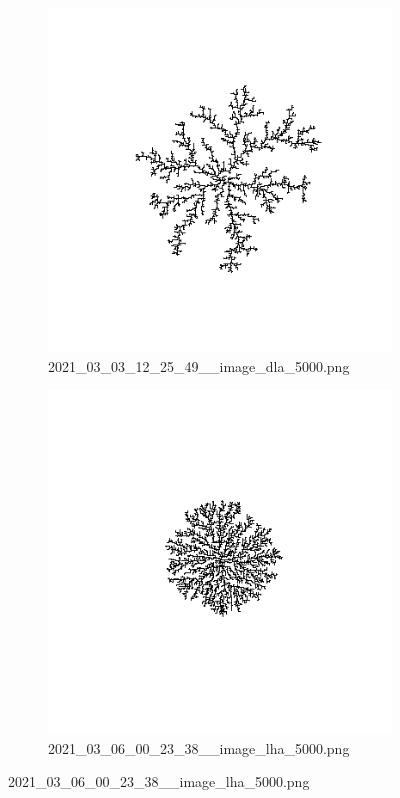 \documentclass[12pt,a4paper]{scrartcl}
\numberwithin{equation}{subsection}
\newcommand{\1}{\mathbbm{1}}
\numberwithin{equation}{section}
\theoremstyle{definition}
\begin{document}
\begin{figure}[h!]
	\centering
	\begin{subfigure}[b]{.49\textwidth}
		\includegraphics[width=1\linewidth]{images/ia/2021_03_03_12_25_49__image_dla_5000.png}
		\caption{2021\_03\_03\_12\_25\_49\_\_image\_dla\_5000.png}
	\end{subfigure}
	\begin{subfigure}[b]{.49\textwidth}
		\includegraphics[width=1\linewidth]{images/ia/2021_03_06_00_23_38__image_lha_5000.png}
		\caption{2021\_03\_06\_00\_23\_38\_\_image\_lha\_5000.png}
	\end{subfigure}
\end{figure}
\end{document}
